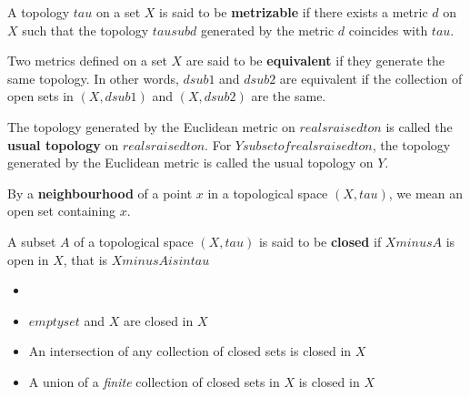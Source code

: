 \begin{defn}
A topology $tau$ on a set $X$ is said to be \textbf{metrizable} if there exists a metric $d$ on $X$ such that the topology $tau sub d$ generated by the metric $d$ coincides with $tau$.
\end{defn}

\begin{defn}
Two metrics defined on a set $X$ are said to be \textbf{equivalent} if they generate the same topology. 
In other words, $d sub 1$ and $d sub 2$ are equivalent if the collection of open sets in $(X, d sub 1)$ and $(X, d sub 2)$ are the same.
\end{defn}

\begin{defn}
The topology generated by the Euclidean metric on $reals raised to n$ is called the \textbf{usual topology} on $reals raised to n$.
For $Y subset of reals raised to n$, the topology generated by the Euclidean metric is called the usual topology on $Y$.
\end{defn}

\begin{defn}
By a \textbf{neighbourhood} of a point $x$ in a topological space $(X, tau)$, we mean an open set containing $x$.
\end{defn}

\begin{defn}
A subset $A$ of a topological space $(X, tau)$ is said to be \textbf{closed} if $X minus A$ is open in $X$, that is $X minus A is in tau$
\end{defn}

\begin{thm}
    \begin{itemize}
        \item[]
        \item  $empty set$ and $X$ are closed in $X$
        \item An intersection of any collection of closed sets is closed in $X$
        \item A union of a \textit{finite} collection of closed sets in $X$ is closed in $X$
    \end{itemize}
\end{thm}

\hhrule

